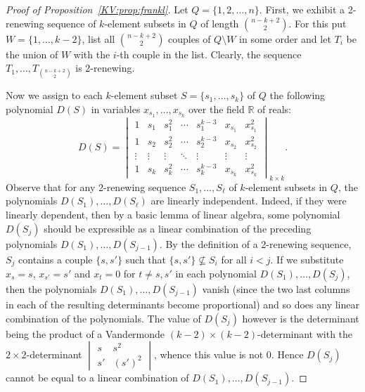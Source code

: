 \documentclass{irmaart}
\theoremstyle{plain}
\begin{document}
\begin{proof}[Proof of Proposition~\ref{KV:prop:frankl}] Let $Q=\{1,2,\dots,n\}$.
First, we exhibit a 2-renewing sequence of $k$-element subsets in $Q$ of length
$\binom{n-k+2}2$. For this put $W=\{1,\dots,k-2\}$, list all $\binom{n-k+2}2$
couples of $Q\setminus W$ in some order and let $T_i$ be the union of $W$ with
the $i$-th couple in the list. Clearly, the sequence
$T_1,\dots,T_{\binom{n-k+2}2}$ is 2-renewing.

Now we assign to each $k$-element subset $S=\{s_1,\dots,s_k\}$ of $Q$ the
following polynomial $D(S)$ in variables $x_{s_1},\dots,x_{s_k}$ over the field
$\mathbb{R}$ of reals:
\begin{displaymath}
D(S)=\begin{vmatrix}
1 & s_1 & s_1^2 & \cdots & s_1^{k-3} & x_{s_1} & x_{s_1}^2\\
1 & s_2 & s_2^2 & \cdots & s_2^{k-3} & x_{s_2} & x_{s_2}^2\\
\vdots & \vdots & \vdots & \ddots & \vdots & \vdots & \vdots\\
1 & s_k & s_k^2 & \cdots & s_k^{k-3} & x_{s_k} & x_{s_k}^2
\end{vmatrix}_{k\times k}.
\end{displaymath}
Observe that for any 2-renewing sequence $S_1,\dots,S_\ell$ of $k$-element
subsets in $Q$, the polynomials $D(S_1),\dots,D(S_\ell)$ are linearly
independent. Indeed, if they were linearly dependent, then by a basic lemma of
linear algebra, some polynomial $D(S_j)$ should be expressible as a linear
combination of the preceding polynomials $D(S_1),\dots,D(S_{j-1})$. By the
definition of a 2-renewing sequence, $S_j$ contains a couple $\{s,s'\}$ such
that $\{s,s'\}\nsubseteq S_i$ for all $i<j$. If we substitute $x_s=s$,
$x_{s'}=s'$ and $x_t=0$ for $t\ne s,s'$ in each polynomial
$D(S_1),\dots,D(S_j)$, then the polynomials $D(S_1),\dots,D(S_{j-1})$ vanish
(since the two last columns in each of the resulting determinants become
proportional) and so does any linear combination of the polynomials. The value
of $D(S_j)$ however is the determinant being the product of a Vandermonde
$(k-2)\times(k-2)$-determinant with the $2\times 2$-determinant $\begin{vmatrix} s & s^2\\
s' & (s')^2\end{vmatrix}$, whence this value is not 0. Hence $D(S_j)$ cannot be
equal to a linear combination of $D(S_1),\dots,D(S_{j-1})$.


\end{proof}
\end{document}
